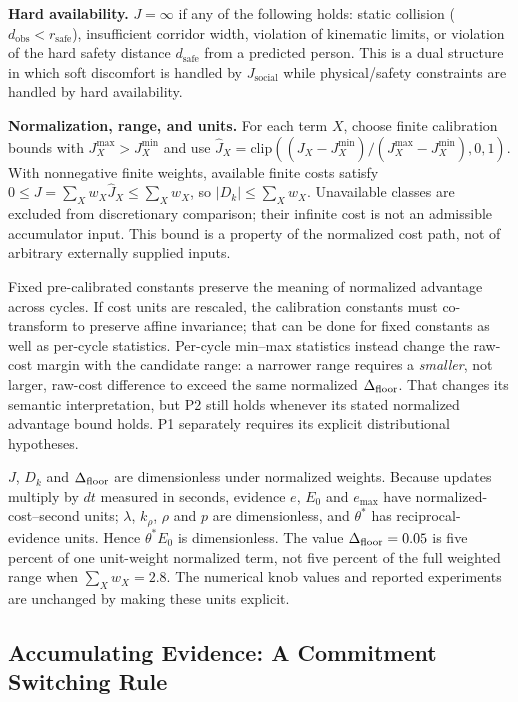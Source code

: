 \textbf{Hard availability.} $J = \infty$ if any of the following holds: static collision ($d_{\text{obs}} < r_{\text{safe}}$), insufficient corridor width, violation of kinematic limits, or violation of the hard safety distance $d_{\text{safe}}$ from a predicted person. This is a dual structure in which soft discomfort is handled by $J_{\text{social}}$ while physical/safety constraints are handled by hard availability.

\textbf{Normalization, range, and units.} For each term $X$, choose finite calibration bounds with $J_X^{\max}>J_X^{\min}$ and use $\hat J_X=\mathrm{clip}((J_X-J_X^{\min})/(J_X^{\max}-J_X^{\min}),0,1)$. With nonnegative finite weights, available finite costs satisfy $0\le J=\sum_Xw_X\hat J_X\le\sum_Xw_X$, so $|D_k|\le\sum_Xw_X$. Unavailable classes are excluded from discretionary comparison; their infinite cost is not an admissible accumulator input. This bound is a property of the normalized cost path, not of arbitrary externally supplied  inputs.

Fixed pre-calibrated constants preserve the meaning of normalized advantage across cycles. If cost units are rescaled, the calibration constants must co-transform to preserve affine invariance; that can be done for fixed constants as well as per-cycle statistics. Per-cycle min--max statistics instead change the raw-cost margin with the candidate range: a narrower range requires a \emph{smaller}, not larger, raw-cost difference to exceed the same normalized $\Delta_{\text{floor}}$. That changes its semantic interpretation, but P2 still holds whenever its stated normalized advantage bound holds. P1 separately requires its explicit distributional hypotheses.

$J$, $D_k$ and $\Delta_{\text{floor}}$ are dimensionless under normalized weights. Because updates multiply by $dt$ measured in seconds, evidence $e$, $E_0$ and $e_{\max}$ have normalized-cost--second units; $\lambda$, $k_\rho$, $\rho$ and $p$ are dimensionless, and $\theta^*$ has reciprocal-evidence units. Hence $\theta^*E_0$ is dimensionless. The value $\Delta_{\text{floor}}=0.05$ is five percent of one unit-weight normalized term, not five percent of the full weighted range when $\sum_Xw_X=2.8$. The numerical knob values and reported experiments are unchanged by making these units explicit.


\subsection{Accumulating Evidence: A Commitment Switching Rule}\label{subsec:switch}

